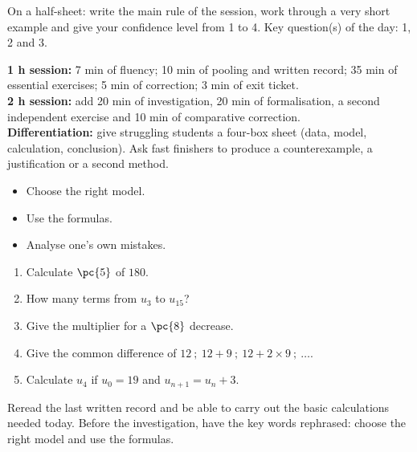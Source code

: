 \begin{exitticket}[3 minutes]On a half-sheet: write the main rule of the session, work through a very short example and give your confidence level from 1 to 4. Key question(s) of the day: 1, 2 and 3.\end{exitticket}

\ifmxteacher
\begin{method}
\textbf{1 h session:} 7 min of fluency; 10 min of pooling and written record; 35 min of essential exercises; 5 min of correction; 3 min of exit ticket.\\
    \textbf{2 h session:} add 20 min of investigation, 20 min of formalisation, a second independent exercise and 10 min of comparative correction.\\
    \textbf{Differentiation:} give struggling students a four-box sheet (data, model, calculation, conclusion). Ask fast finishers to produce a counterexample, a justification or a second method.
\end{method}
\fi
{}
\begin{objectives}\begin{itemize}\item Choose the right model.\item Use the formulas.\item Analyse one's own mistakes.\end{itemize}\end{objectives}
\begin{fluency}\begin{enumerate}\item Calculate $\pc{5}$ of $180$. \item How many terms from $u_3$ to $u_{15}$? \item Give the multiplier for a $\pc{8}$ decrease. \item Give the common difference of $12\ ;\ 12+9\ ;\ 12+2\times9\ ;\ \ldots$. \item Calculate $u_4$ if $u_0=19$ and $u_{n+1}=u_n+3$. \end{enumerate}\end{fluency}
\begin{prerequisites}Reread the last written record and be able to carry out the basic calculations needed today. Before the investigation, have the key words rephrased: choose the right model and use the formulas.\end{prerequisites}

